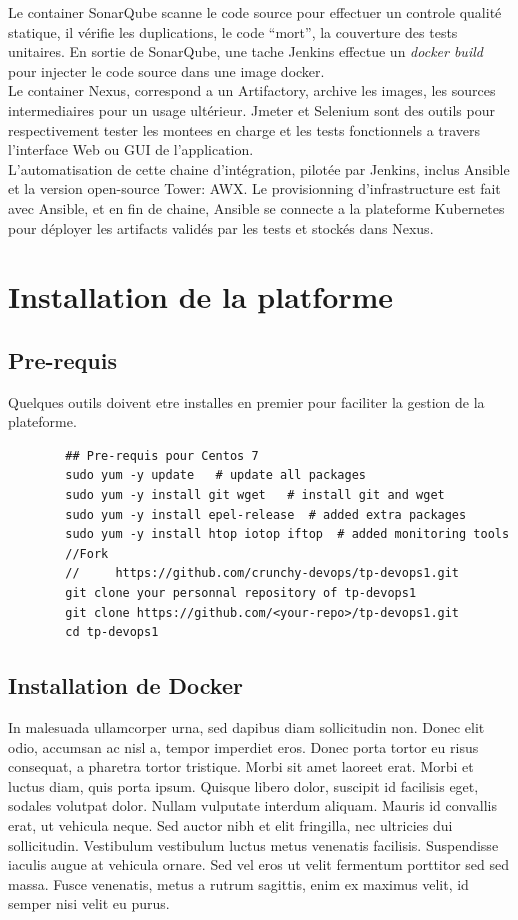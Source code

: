 \documentclass{article}
\begin{document}
Le container SonarQube scanne le code source pour effectuer un controle qualité statique, il vérifie les duplications,
le code ``mort'', la couverture des tests unitaires.
En sortie de SonarQube, une tache Jenkins effectue un \textit{docker build} pour injecter le code source dans une image
docker. \\
Le container Nexus, correspond a un Artifactory, archive les images, les sources intermediaires pour un usage ultérieur.
Jmeter et Selenium sont des outils pour respectivement tester les montees en charge et les tests fonctionnels a travers
l'interface Web ou GUI de l'application. \\
L'automatisation de cette chaine d'intégration, pilotée par Jenkins, inclus Ansible et la version open-source Tower: AWX.
Le provisionning d'infrastructure est fait avec Ansible, et en fin de chaine, Ansible se connecte a la plateforme Kubernetes
pour déployer les artifacts validés par les tests et stockés dans Nexus.


\section{Installation de la platforme}
\subsection{Pre-requis}
Quelques outils doivent etre installes en premier pour faciliter la gestion de la plateforme.
\begin{commandline}
	\begin{verbatim}
		## Pre-requis pour Centos 7
		sudo yum -y update   # update all packages
		sudo yum -y install git wget   # install git and wget
		sudo yum -y install epel-release  # added extra packages
		sudo yum -y install htop iotop iftop  # added monitoring tools
		//Fork
		//     https://github.com/crunchy-devops/tp-devops1.git
		git clone your personnal repository of tp-devops1
		git clone https://github.com/<your-repo>/tp-devops1.git
		cd tp-devops1
	\end{verbatim}
\end{commandline}

\subsection{Installation de Docker}

In malesuada ullamcorper urna, sed dapibus diam sollicitudin non. Donec elit odio, accumsan ac nisl a, tempor imperdiet eros. Donec porta tortor eu risus consequat, a pharetra tortor tristique. Morbi sit amet laoreet erat. Morbi et luctus diam, quis porta ipsum. Quisque libero dolor, suscipit id facilisis eget, sodales volutpat dolor. Nullam vulputate interdum aliquam. Mauris id convallis erat, ut vehicula neque. Sed auctor nibh et elit fringilla, nec ultricies dui sollicitudin. Vestibulum vestibulum luctus metus venenatis facilisis. Suspendisse iaculis augue at vehicula ornare. Sed vel eros ut velit fermentum porttitor sed sed massa. Fusce venenatis, metus a rutrum sagittis, enim ex maximus velit, id semper nisi velit eu purus.
\end{document}
